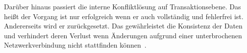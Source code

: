 Darüber hinaus passiert die interne Konfliktlösung auf Transaktionsebene. Das heißt der Vorgang ist nur erfolgreich wenn er auch vollständig und fehlerfrei ist. Andererseits wird er zurückgesetzt. Das gewährleistet die Konsistenz der Daten und verhindert deren Verlust wenn Änderungen aufgrund einer unterbrochenen Netzwerkverbindung nicht stattfinden können~\cite{realm_offline_whitepaper}.